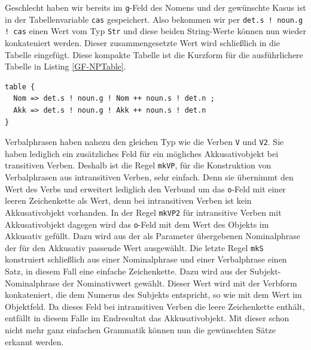 Geschlecht haben wir bereits im \texttt{g}-Feld des Nomens und der gewünschte Kasus ist in der Tabellenvariable \texttt{cas} gespeichert. Also bekommen wir per \texttt{det.s ! noun.g ! cas} einen Wert vom Typ \texttt{Str} und diese beiden String-Werte können nun wieder konkateniert werden. Dieser zusammengesetzte Wert wird schließlich in die Tabelle eingefügt. Diese kompakte Tabelle ist die Kurzform für die ausführlichere Tabelle in Listing \ref{GF-NPTable}.
\begin{lstlisting}[float=ht,caption={Ausführliche Form der Tabelle in Zeile 13 des Listings \ref{GF-SatzGer}},label={GF-NPTable}]
table { 
  Nom => det.s ! noun.g ! Nom ++ noun.s ! det.n ; 
  Akk => det.s ! noun.g ! Akk ++ noun.s ! det.n 
}
\end{lstlisting}
Verbalphrasen haben nahezu den gleichen Typ wie die Verben \texttt{V} und \texttt{V2}. Sie haben lediglich ein zusätzliches Feld für ein mögliches Akkusativobjekt bei transitiven Verben. Deshalb ist die Regel \texttt{mkVP}, für die Konstruktion von Verbalphrasen aus intransitiven Verben, sehr einfach. Denn sie übernimmt den Wert des Verbs und erweitert lediglich den Verbund um das \texttt{o}-Feld mit einer leeren Zeichenkette als Wert, denn bei intransitiven Verben ist kein Akkusativobjekt vorhanden. In der Regel \texttt{mkVP2} für intransitive Verben mit Akkusativobjekt dagegen wird das \texttt{o}-Feld mit dem Wert des Objekts im Akkusativ gefüllt. Dazu wird aus der als Parameter übergebenen Nominalphrase der für den Akkusativ passende Wert ausgewählt. Die letzte Regel \texttt{mkS} konstruiert schließlich aus einer Nominalphrase und einer Verbalphrase einen Satz, in diesem Fall eine einfache Zeichenkette. Dazu wird aus der Subjekt-Nominalphrase der Nominativwert gewählt. Dieser Wert wird mit der Verbform konkateniert, die dem Numerus des Subjekts entspricht, so wie mit dem Wert im Objektfeld. Da dieses Feld bei intransitiven Verben die leere Zeichenkette enthält, entfällt in diesem Falle im Endresultat das Akkusativobjekt. Mit dieser schon nicht mehr ganz einfachen Grammatik können nun die gewünschten Sätze erkannt werden. \par

